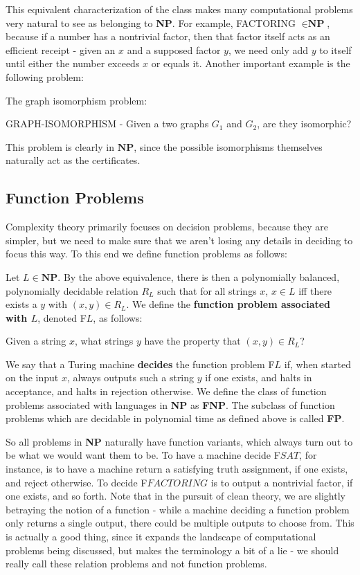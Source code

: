This equivalent characterization of the class makes many computational problems very natural to see as belonging to \textbf{NP}. For example, FACTORING $\in \textbf{NP}$, because if a number has a nontrivial factor, then that factor itself acts as an efficient receipt - given an $x$ and a supposed factor $y$, we need only add $y$ to itself until either the number exceeds $x$ or equals it. Another important example is the following problem:
\begin{problem}
    The graph isomorphism problem:
    \begin{center}
        GRAPH-ISOMORPHISM - Given a two graphs $G_1$ and $G_2$, are they isomorphic?
    \end{center}
\end{problem}
This problem is clearly in $\textbf{NP}$, since the possible isomorphisms themselves naturally act as the certificates. 
\subsection{Function Problems}
\par Complexity theory primarily focuses on decision problems, because they are simpler, but we need to make sure that we aren't losing any details in deciding to focus this way. To this end we define function problems as follows:
\begin{definition}
    Let $L \in \textbf{NP}$. By the above equivalence, there is then a polynomially balanced, polynomially decidable relation $R_L$ such that for all strings $x$, $x \in L$ iff there exists a $y$ with $(x,y) \in R_L$. We define the \textbf{function problem associated with $L$}, denoted F$L$, as follows:
    \begin{center}
        Given a string $x$, what strings $y$ have the property that $(x,y) \in R_L$?
    \end{center}
    We say that a Turing machine \textbf{decides} the function problem F$L$ if, when started on the input $x$, always outputs such a string $y$ if one exists, and halts in acceptance, and halts in rejection otherwise. We define the class of function problems associated with languages in \textbf{NP} as \textbf{FNP}. The subclass of function problems which are decidable in polynomial time as defined above is called \textbf{FP}.
\end{definition}
So all problems in \textbf{NP} naturally have function variants, which always turn out to be what we would want them to be. To have a machine decide F$SAT$, for instance, is to have a machine return a satisfying truth assignment, if one exists, and reject otherwise. To decide F$FACTORING$ is to output a nontrivial factor, if one exists, and so forth. Note that in the pursuit of clean theory, we are slightly betraying the notion of a function - while a machine deciding a function problem only returns a single output, there could be multiple outputs to choose from. This is actually a good thing, since it expands the landscape of computational problems being discussed, but makes the terminology a bit of a lie - we should really call these relation problems and not function problems.
